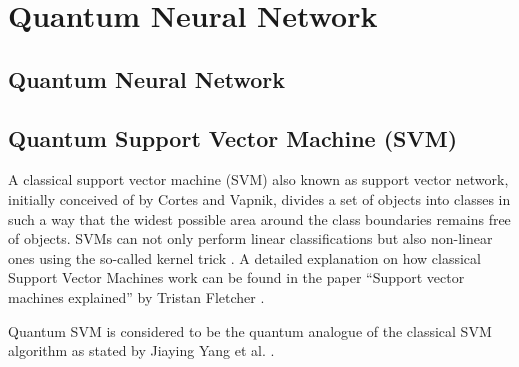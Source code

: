 
\newpage

\section{Quantum Neural Network}

\subsection{Quantum Neural Network}


\subsection{Quantum Support Vector Machine (SVM)}
A classical support vector machine (SVM) also known as support vector network, initially conceived of by Cortes and Vapnik, divides a set of objects into classes in such a way that the widest possible area around the class boundaries remains free of objects. SVMs can not only perform linear classifications but also non-linear ones using the so-called kernel trick \cite{Cortes2004SupportVectorN}. A detailed explanation on how classical Support Vector Machines work can be found in the paper “Support vector machines explained” by Tristan Fletcher \cite{fletcher2009support}. 

Quantum SVM is considered to be the quantum analogue of the classical SVM algorithm as stated by Jiaying Yang et al. \cite{yangSupportVectorMachines2019}.

